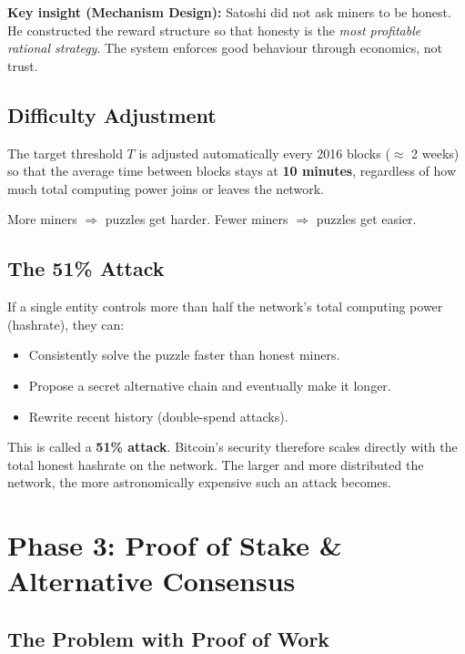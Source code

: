 \documentclass[12pt, a4paper]{article}
\begin{document}
\textbf{Key insight (Mechanism Design):} Satoshi did not ask miners to be honest.
He constructed the reward structure so that honesty is the \emph{most profitable
rational strategy}. The system enforces good behaviour through economics, not trust.

\subsection{Difficulty Adjustment}

The target threshold $T$ is adjusted automatically every 2016 blocks
($\approx$ 2 weeks) so that the average time between blocks stays at
\textbf{10 minutes}, regardless of how much total computing power joins or
leaves the network.

More miners $\Rightarrow$ puzzles get harder. Fewer miners $\Rightarrow$ puzzles
get easier.

\subsection{The 51\% Attack}

If a single entity controls more than half the network's total computing power
(hashrate), they can:
\begin{itemize}
    \item Consistently solve the puzzle faster than honest miners.
    \item Propose a secret alternative chain and eventually make it longer.
    \item Rewrite recent history (double-spend attacks).
\end{itemize}

This is called a \textbf{51\% attack}. Bitcoin's security therefore scales
directly with the total honest hashrate on the network. The larger and more
distributed the network, the more astronomically expensive such an attack becomes.

\section{Phase 3: Proof of Stake \& Alternative Consensus}

\subsection{The Problem with Proof of Work}
\end{document}
